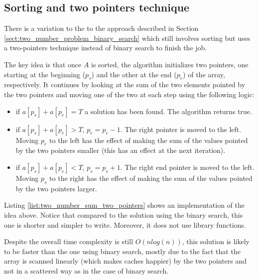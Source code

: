 


\subsection{Sorting and two pointers technique}
\label{sec:two_numbers:twopointers}

There is a variation to the to the approach described in Section
\ref{sect:two_number_problem_binary_search} which still involves sorting but uses a two-pointers
technique instead of binary search to finish the job. 

The key idea is that once $A$ is sorted, the algorithm initializes
two pointers, one starting at the beginning ($p_s$) and the other at the end ($p_e$) of the array, respectively.
It continues by looking at the sum of the two elements pointed by the two pointers and moving one of
the two at each step using the following logic: 
\begin{itemize}
	\item if $a[p_s]+a[p_e] = T$ a solution has been found. The algorithm returns true.
	\item if $a[p_s]+a[p_e] > T$, $p_e=p_e-1$. The right pointer is moved to the left. 
	Moving	$p_e$ to the left has the effect of making the sum of the values pointed by the two pointers smaller (this has an effect at the next iteration). 
	\item if $a[p_s]+a[p_e] < T$, $p_s=p_s+1$. The right end pointer is moved to the left. Moving $p_s$ to the right has the effect of making the sum of the values pointed by the two pointers larger. 
\end{itemize}



Listing \ref{list:two_number_sum_two_pointers} shows an implementation of the idea above. Notice that compared to the solution using the binary search, this one is shorter and simpler to write. Moreover, it does not use library functions. 



Despite the overall time complexity is still $O(n log(n))$, this solution is likely to be faster than
the one using binary search, mostly due to the fact that the array is scanned linearly (which makes caches happier) by the two pointers and not in a scattered way as in the case of binary search.

